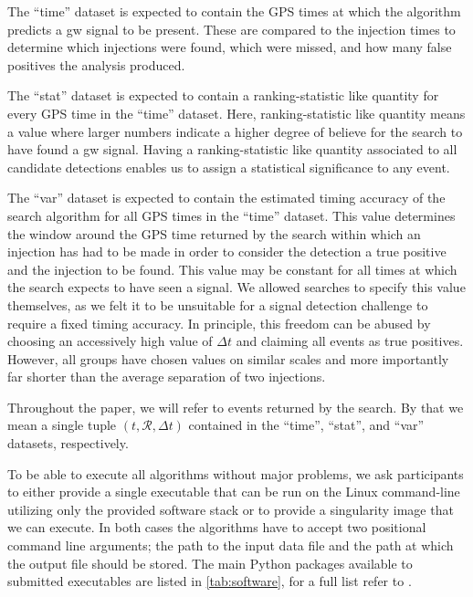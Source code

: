 The ``time'' dataset is expected to contain the GPS times at which the algorithm predicts a \acrshort{gw} signal to be present. These are compared to the injection times to determine which injections were found, which were missed, and how many false positives the analysis produced.

The ``stat'' dataset is expected to contain a ranking-statistic like quantity for every GPS time in the ``time'' dataset. Here, ranking-statistic like quantity means a value where larger numbers indicate a higher degree of believe for the search to have found a \acrshort{gw} signal. Having a ranking-statistic like quantity associated to all candidate detections enables us to assign a statistical significance to any event.

The ``var'' dataset is expected to contain the estimated timing accuracy of the search algorithm for all GPS times in the ``time'' dataset. This value determines the window around the GPS time returned by the search within which an injection has had to be made in order to consider the detection a true positive and the injection to be found. This value may be constant for all times at which the search expects to have seen a signal. We allowed searches to specify this value themselves, as we felt it to be unsuitable for a signal detection challenge to require a fixed timing accuracy. In principle, this freedom can be abused by choosing an accessively high value of $\Delta t$ and claiming all events as true positives. However, all groups have chosen values on similar scales and more importantly far shorter than the average separation of two injections.

Throughout the paper, we will refer to events returned by the search. By that we mean a single tuple $\left(t, \mathcal{R}, \Delta t\right)$ contained in the ``time'', ``stat'', and ``var'' datasets, respectively.

To be able to execute all algorithms without major problems, we ask participants to either provide a single executable that can be run on the Linux command-line utilizing only the provided software stack or to provide a singularity image that we can execute. In both cases the algorithms have to accept two positional command line arguments; the path to the input data file and the path at which the output file should be stored. The main Python packages available to submitted executables are listed in \autoref{tab:software}, for a full list refer to \cite{github}.

